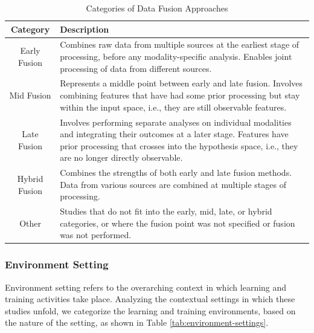 \documentclass[manuscript,screen,review]{acmart}
\begin{document}
\begin{table}[ht]
    \caption{Categories of Data Fusion Approaches}
    \label{tab:data-fusion-categories}
    \centering
    \begin{tabular}{|c|p{}|}
        \hline
        \textbf{Category} & \textbf{Description} \\
        \hline
        Early Fusion & Combines raw data from multiple sources at the earliest stage of processing, before any modality-specific analysis. Enables joint processing of data from different sources. \\
        \hline
        Mid Fusion & Represents a middle point between early and late fusion. Involves combining features that have had some prior processing but stay within the input space, i.e., they are still observable features. \\
        \hline
        Late Fusion & Involves performing separate analyses on individual modalities and integrating their outcomes at a later stage. Features have prior processing that crosses into the hypothesis space, i.e., they are no longer directly observable. \\
        \hline
        Hybrid Fusion & Combines the strengths of both early and late fusion methods. Data from various sources are combined at multiple stages of processing. \\
        \hline
        Other & Studies that do not fit into the early, mid, late, or hybrid categories, or where the fusion point was not specified or fusion was not performed. \\
        \hline
    \end{tabular}
\end{table}


\subsubsection{Environment Setting} \label{subsec:environment_setting}

Environment setting refers to the overarching context in which learning and training activities take place. Analyzing the contextual settings in which these studies unfold, we categorize the learning and training environments, based on the nature of the setting, as shown in Table \ref{tab:environment-settings}.
\end{document}
